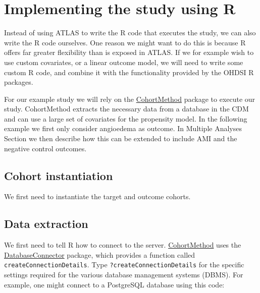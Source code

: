 \documentclass[]{book}
\begin{document}
\hypertarget{pleR}{%
\section{Implementing the study using R}\label{pleR}}

Instead of using ATLAS to write the R code that executes the study, we can also write the R code ourselves. One reason we might want to do this is because R offers far greater flexibility than is exposed in ATLAS. If we for example wish to use custom covariates, or a linear outcome model, we will need to write some custom R code, and combine it with the functionality provided by the OHDSI R packages.

For our example study we will rely on the \href{https://ohdsi.github.io/CohortMethod/}{CohortMethod} package to execute our study. CohortMethod extracts the necessary data from a database in the CDM and can use a large set of covariates for the propensity model. In the following example we first only consider angioedema as outcome. In Multiple Analyses Section we then describe how this can be extended to include AMI and the negative control outcomes.

\hypertarget{cohort-instantiation}{%
\subsection{Cohort instantiation}\label{cohort-instantiation}}

We first need to instantiate the target and outcome cohorts.

\hypertarget{data-extraction}{%
\subsection{Data extraction}\label{data-extraction}}

We first need to tell R how to connect to the server. \href{https://ohdsi.github.io/CohortMethod/}{CohortMethod} uses the \href{https://ohdsi.github.io/DatabaseConnector/}{DatabaseConnector} package, which provides a function called \texttt{createConnectionDetails}. Type \texttt{?createConnectionDetails} for the specific settings required for the various database management systems (DBMS). For example, one might connect to a PostgreSQL database using this code:
\end{document}
